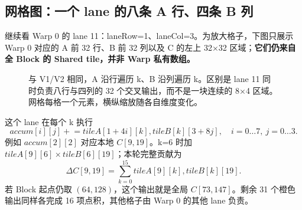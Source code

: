 \subsection{网格图：一个 lane 的八条 A 行、四条 B 列}
继续看 Warp 0 的 lane 11：laneRow=1、laneCol=3。为放大格子，下图只展示 Warp 0 对应的 A 前 32 行、B 前 32 列以及 C 的左上 32×32 区域；\textbf{它们仍来自全 Block 的 Shared tile，并非 Warp 私有数组。}
\begin{figure}[H]\centering

\caption{与 V1/V2 相同，A 沿行遍历 k、B 沿列遍历 k。区别是 lane 11 同时负责八行与四列的 32 个交叉输出，而不是一块连续的 8×4 区域。网格每格一个元素，横纵缩放随各自维度变化。}
\end{figure}
这个 lane 在每个 k 执行
\[
accum[i][j]\mathrel{+}=tileA[1+4i][k],tileB[k][3+8j],\quad i=0\ldots7,\ j=0\ldots3.
\]
例如 $accum[2][2]$ 对应本地 $C[9,19]$。k=6 时加 $tileA[9][6]\times tileB[6][19]$；本轮完整贡献为
\[
\Delta C[9,19]=\sum_{k=0}^{15}tileA[9][k],tileB[k][19].
\]
若 Block 起点仍取 $(64,128)$，这个输出就是全局 $C[73,147]$。剩余 31 个橙色输出同样各完成 16 项点积，其他格子由 Warp 0 的其他 lane 负责。
\pagebreakhere
